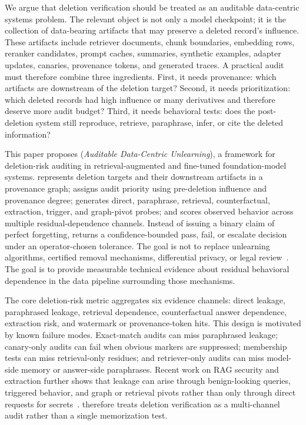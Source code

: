 We argue that deletion verification should be treated as an auditable data-centric systems problem. The relevant object is not only a model checkpoint; it is the collection of data-bearing artifacts that may preserve a deleted record's influence. These artifacts include retriever documents, chunk boundaries, embedding rows, reranker candidates, prompt caches, summaries, synthetic examples, adapter updates, canaries, provenance tokens, and generated traces. A practical audit must therefore combine three ingredients. First, it needs provenance: which artifacts are downstream of the deletion target? Second, it needs prioritization: which deleted records had high influence or many derivatives and therefore deserve more audit budget? Third, it needs behavioral tests: does the post-deletion system still reproduce, retrieve, paraphrase, infer, or cite the deleted information?

This paper proposes \method{} (\emph{Auditable Data-Centric Unlearning}), a framework for deletion-risk auditing in retrieval-augmented and fine-tuned foundation-model systems. \method{} represents deletion targets and their downstream artifacts in a provenance graph; assigns audit priority using pre-deletion influence and provenance degree; generates direct, paraphrase, retrieval, counterfactual, extraction, trigger, and graph-pivot probes; and scores observed behavior across multiple residual-dependence channels. Instead of issuing a binary claim of perfect forgetting, \method{} returns a confidence-bounded pass, fail, or escalate decision under an operator-chosen tolerance. The goal is not to replace unlearning algorithms, certified removal mechanisms, differential privacy, or legal review~\cite{dwork2006dp,guo2020certified}. The goal is to provide measurable technical evidence about residual behavioral dependence in the data pipeline surrounding those mechanisms.

The core deletion-risk metric aggregates six evidence channels: direct leakage, paraphrased leakage, retrieval dependence, counterfactual answer dependence, extraction risk, and watermark or provenance-token hits. This design is motivated by known failure modes. Exact-match audits can miss paraphrased leakage; canary-only audits can fail when obvious markers are suppressed; membership tests can miss retrieval-only residues; and retriever-only audits can miss model-side memory or answer-side paraphrases. Recent work on RAG security and extraction further shows that leakage can arise through benign-looking queries, triggered behavior, and graph or retrieval pivots rather than only through direct requests for secrets~\cite{wang2025ikea,xie2026canaryrag,song2026grasp,thornton2026retrievalpivot}. \method{} therefore treats deletion verification as a multi-channel audit rather than a single memorization test.

